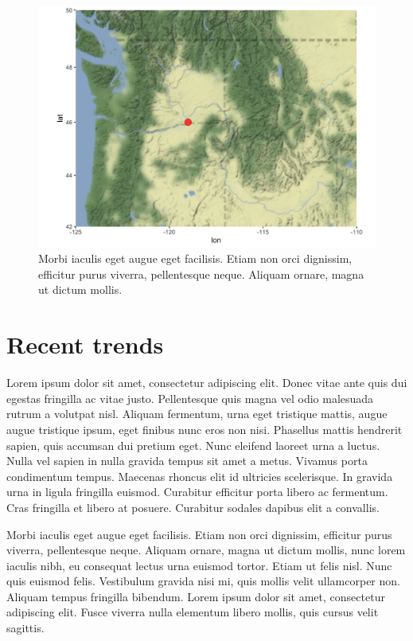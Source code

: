 \documentclass[
  letterpaper,
  oneside,
  open=any]{scrbook}
\begin{document}
\begin{figure}

{\centering \includegraphics[width=4.48in,height=\textheight]{text/../images/fig-map.png}

}

\caption{\label{fig-map}Morbi iaculis eget augue eget facilisis. Etiam
non orci dignissim, efficitur purus viverra, pellentesque neque. Aliquam
ornare, magna ut dictum mollis.}

\end{figure}

\hypertarget{recent-trends}{%
\section{Recent trends}\label{recent-trends}}

Lorem ipsum dolor sit amet, consectetur adipiscing elit. Donec vitae
ante quis dui egestas fringilla ac vitae justo. Pellentesque quis magna
vel odio malesuada rutrum a volutpat nisl. Aliquam fermentum, urna eget
tristique mattis, augue augue tristique ipsum, eget finibus nunc eros
non nisi. Phasellus mattis hendrerit sapien, quis accumsan dui pretium
eget. Nunc eleifend laoreet urna a luctus. Nulla vel sapien in nulla
gravida tempus sit amet a metus. Vivamus porta condimentum tempus.
Maecenas rhoncus elit id ultricies scelerisque. In gravida urna in
ligula fringilla euismod. Curabitur efficitur porta libero ac fermentum.
Cras fringilla et libero at posuere. Curabitur sodales dapibus elit a
convallis.

Morbi iaculis eget augue eget facilisis. Etiam non orci dignissim,
efficitur purus viverra, pellentesque neque. Aliquam ornare, magna ut
dictum mollis, nunc lorem iaculis nibh, eu consequat lectus urna euismod
tortor. Etiam ut felis nisl. Nunc quis euismod felis. Vestibulum gravida
nisi mi, quis mollis velit ullamcorper non. Aliquam tempus fringilla
bibendum. Lorem ipsum dolor sit amet, consectetur adipiscing elit. Fusce
viverra nulla elementum libero mollis, quis cursus velit sagittis.
\end{document}
